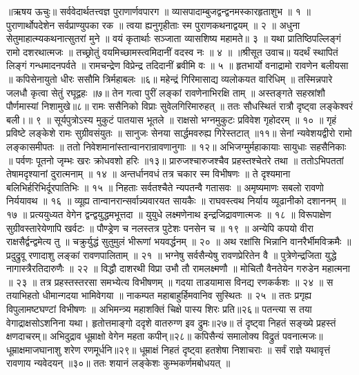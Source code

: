 ॥ऋषय ऊचुः॥
सर्ववेदार्थतत्त्वज्ञ पुराणार्णवपारग ॥
व्यासपादाम्बुजद्वन्द्वनमस्कारहृताशुभ ॥ १ ॥
पुराणार्थोपदेशेन सर्वप्राण्युपका रक ॥
त्वया ह्यनुगृहीताः स्म पुराणकथनाद्वयम् ॥ २ ॥
अधुना सेतुमाहात्म्यकथनात्सुतरां मुने ॥
वयं कृतार्थाः सञ्जाता व्यासशिष्य महामते॥ ३ ॥
यथा प्रातिष्ठिपल्लिङ्गं रामो दशरथात्मजः ॥
तच्छ्रोतुं वयमिच्छामस्त्वमिदानीं वदस्व नः ॥ ४ ॥
॥श्रीसूत उवाच॥
यदर्थं स्थापितं लिङ्गं गन्धमादनपर्वते ॥
रामचन्द्रेण विप्रेन्द्र तदिदानीं ब्रवीमि वः ॥ ५ ॥
हृतभार्यो वनाद्रामो रावणेन बलीयसा ॥
कपिसेनायुतो धीरः ससौमि त्रिर्महाबलः ॥६॥
महेन्द्रं गिरिमासाद्य व्यलोकयत वारिधिम् ॥
तस्मिन्नपारे जलधौ कृत्वा सेतुं रघूद्वहः ॥७॥
तेन गत्वा पुरीं लङ्कां रावणेनाभिरक्षि ताम् ॥
अस्तङ्गते सहस्रांशौ पौर्णमास्यां निशामुखे॥८॥
रामः ससैनिको विप्राः सुवेलगिरिमारुहत् ॥
ततः सौधस्थितं रात्रौ दृष्ट्वा लङ्केश्वरं बली।॥ ९ ॥
सूर्यपुत्रोऽस्य मुकुटं पातयास भूतले ॥
राक्षसो भग्नमुकुटः प्रविवेश गृहोदरम् ॥ १० ॥
गृहं प्रविष्टे लङ्केशे रामः सुग्रीवसंयुतः ॥
सानुजः सेनया सार्द्धमवरुह्य गिरेस्तटात् ॥११॥
सेनां न्यवेशयद्वीरो रामो लङ्कासमीपतः ॥
ततो निवेशमानांस्तान्वानरान्रावणानुगाः ॥ १२॥
अभिजग्मुर्महाकायाः सायुधाः सहसैनिकाः ॥
पर्वणः पूतनो जृम्भः खरः क्रोधवशो हरिः ॥१३॥
प्रारुजश्चारुजश्चैव प्रहस्तश्चेतरे तथा ॥
ततोऽभिपततां तेषामदृश्यानां दुरात्मनाम् ॥ १४ ॥
अन्तर्धानवधं तत्र चकार स्म विभीषणः ॥
ते दृश्यमाना बलिभिर्हरिभिर्दूरपातिभिः ॥ १५ ॥
निहताः सर्वतश्चैते न्यपतन्वै गतासवः ॥
अमृष्यमाणः सबलो रावणो निर्ययावथ ॥ १६ ॥
व्यूह्य तान्वानरान्सर्वान्न्यवारयत सायकैः ॥
राघवस्त्वथ निर्याय व्यूढानीको दशाननम् ॥ १७ ॥
प्रत्ययुध्यत वेगेन द्वन्द्वयुद्धमभूत्तदा ॥
युयुधे लक्ष्मणेनाथ इन्द्रजिद्रावणात्मजः ॥ १८ ॥
विरूपाक्षेण सुग्रीवस्तारेयेणापि खर्वटः ॥
पौण्ड्रेण च नलस्तत्र पुटेशः पनसेन च ॥ १९ ॥
अन्येपि कपयो वीरा राक्षसैर्द्वन्द्वमेत्य तु ॥
चक्रुर्युद्धं सुतुमुलं भीरूणां भयवर्द्धनम् ॥ २० ॥
अथ रक्षांसि भिन्नानि वानरैर्भीमविक्रमैः ॥
प्रदुद्रुवू रणादाशु लङ्कां रावणपालिताम् ॥ २१ ॥
भग्नेषु सर्वसैन्येषु रावणप्रेरितेन वै ॥
पुत्रेणेन्द्रजिता युद्धे नागास्त्रैरतिदारुणैः ॥ २२ ॥
विद्धौ दाशरथी विप्रा उभौ तौ रामलक्ष्मणौ ॥
मोचितौ वैनतेयेन गरुडेन महात्मना ॥ २३ ॥
तत्र प्रहस्तस्तरसा समभ्येत्य विभीषणम् ॥
गदया ताडयामास विनद्य रणकर्कशः ॥ २४ ॥
स तयाभिहतो धीमान्गदया भामिवेगया ॥
नाकम्पत महाबाहुर्हिमवानिव सुस्थितः ॥ २५ ॥
ततः प्रगृह्य विपुलामष्टघण्टां विभीषणः ॥
अभिमन्त्र्य महाशक्तिं चिक्षे पास्य शिरः प्रति॥२६॥
पतन्त्या स तया वेगाद्राक्षसोऽशनिना यथा।
हृतोत्तमाङ्गो ददृशे वातरुग्ण इव द्रुमः॥२७॥
तं दृष्ट्वा निहतं सङ्ख्ये प्रहस्तं क्षणदाचरम्॥
अभिदुद्राव धूम्राक्षो वेगेन महता कपीन्॥२८॥
कपिसैन्यं समालोक्य विद्रुतं पवनात्मजः॥
धूम्राक्षमाजघानाशु शरेण रणमूर्धनि॥२९॥
धूम्राक्षं निहतं दृष्ट्वा हतशेषा निशाचराः ॥
सर्वं राज्ञे यथावृत्तं रावणाय न्यवेदयन् ॥३०॥
ततः शयानं लङ्केशः कुम्भकर्णमबोधयत् ॥
